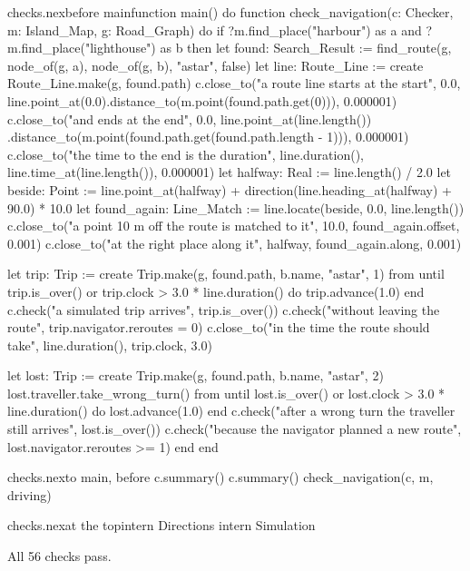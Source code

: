 \begin{addbefore}{checks.nex}{before main}{function main() do}
function check_navigation(c: Checker, m: Island_Map, g: Road_Graph) do
  if ?m.find_place("harbour") as a and ?m.find_place("lighthouse") as b then
    let found: Search_Result := find_route(g, node_of(g, a), node_of(g, b), "astar", false)
    let line: Route_Line := create Route_Line.make(g, found.path)
    c.close_to("a route line starts at the start", 0.0,
      line.point_at(0.0).distance_to(m.point(found.path.get(0))), 0.000001)
    c.close_to("and ends at the end", 0.0, line.point_at(line.length())
      .distance_to(m.point(found.path.get(found.path.length - 1))), 0.000001)
    c.close_to("the time to the end is the duration", line.duration(),
      line.time_at(line.length()), 0.000001)
    let halfway: Real := line.length() / 2.0
    let beside: Point := line.point_at(halfway)
      + direction(line.heading_at(halfway) + 90.0) * 10.0
    let found_again: Line_Match := line.locate(beside, 0.0, line.length())
    c.close_to("a point 10 m off the route is matched to it", 10.0, found_again.offset, 0.001)
    c.close_to("at the right place along it", halfway, found_again.along, 0.001)

    let trip: Trip := create Trip.make(g, found.path, b.name, "astar", 1)
    from
    until
      trip.is_over() or trip.clock > 3.0 * line.duration()
    do
      trip.advance(1.0)
    end
    c.check("a simulated trip arrives", trip.is_over())
    c.check("without leaving the route", trip.navigator.reroutes = 0)
    c.close_to("in the time the route should take", line.duration(), trip.clock, 3.0)

    let lost: Trip := create Trip.make(g, found.path, b.name, "astar", 2)
    lost.traveller.take_wrong_turn()
    from
    until
      lost.is_over() or lost.clock > 3.0 * line.duration()
    do
      lost.advance(1.0)
    end
    c.check("after a wrong turn the traveller still arrives", lost.is_over())
    c.check("because the navigator planned a new route", lost.navigator.reroutes >= 1)
  end
end
\end{addbefore}

\begin{tightaddbefore}{checks.nex}{to main, before c.summary()}{  c.summary()}
  check_navigation(c, m, driving)
\end{tightaddbefore}

\begin{tightaddbefore}{checks.nex}{at the top}{intern Directions}
intern Simulation
\end{tightaddbefore}


All 56 checks pass.
